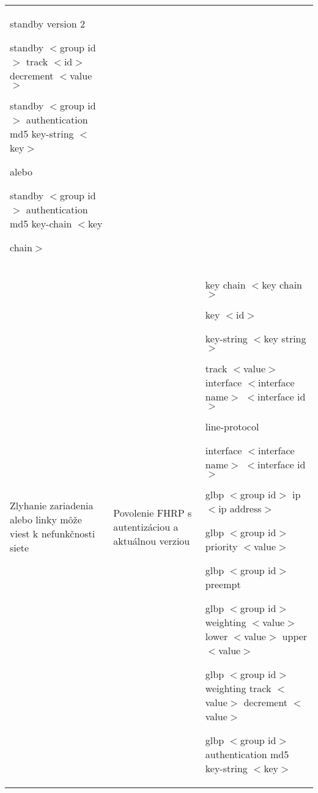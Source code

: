 \begin{longtable}[!htbp]{|L{10em}L{10em}>{\selectfont}L{34em}|}
	\hspace{0.5em}standby version 2
	
	\hspace{0.5em}standby $<$group id$>$ track $<$id$>$ decrement $<$value$>$
	
	\hspace{0.5em}standby $<$group id$>$ authentication md5 key-string $<$key$>$
	
	\vspace{0.5em}
	{\selectfont alebo}
	\vspace{0.5em}
	
	\hspace{0.5em}standby $<$group id$>$ authentication md5 key-chain $<$key 
	
	\hspace{1em}chain$>$\\	
	
	
	
	Zlyhanie zariadenia alebo linky môže viest k nefunkčnosti siete 	&Povolenie FHRP s autentizáciou a aktuálnou verziou	&key chain $<$key chain$>$
	
	\hspace{0.5em}key $<$id$>$
	
	\hspace{1em}key-string $<$key string$>$
	
	track $<$value$>$ interface $<$interface name$>$ $<$interface id$>$
	
	\hspace{0.5em}line-protocol
	
	interface $<$interface name$>$ $<$interface id$>$
	
	\hspace{0.5em}glbp $<$group id$>$ ip $<$ip  address$>$
	
	\hspace{0.5em}glbp $<$group id$>$ priority $<$value$>$
	
	\hspace{0.5em}glbp $<$group id$>$ preempt
	
	\hspace{0.5em}glbp $<$group id$>$ weighting $<$value$>$ lower $<$value$>$ upper $<$value$>$ 
	
	\hspace{0.5em}glbp $<$group id$>$ weighting track $<$value$>$ decrement $<$value$>$
	
	\hspace{0.5em}glbp $<$group id$>$ authentication md5 key-string $<$key$>$
	

\end{longtable}
